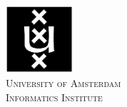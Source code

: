 \begin{titlepage}

\includegraphics[width=2.5cm]{figures/uva-logo.jpg}\\ %
\textsc{\large
        University of Amsterdam\\Informatics Institute
}\\[1.0cm]
 

\vfill %

\end{titlepage}

